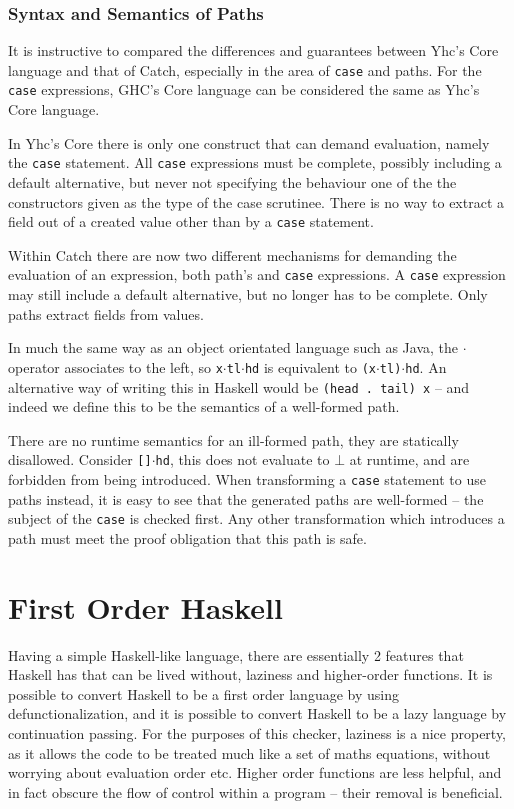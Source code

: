 \documentclass[preprint]{sigplanconf}
\newcommand{\T}[1]{\texttt{#1}}
\newcommand{\D}{\ensuremath{\cdot}} %
\begin{document}
\subsubsection{Syntax and Semantics of Paths}

It is instructive to compared the differences and guarantees between Yhc's Core
language and that of Catch, especially in the area of \T{case} and paths. For
the \T{case} expressions, GHC's Core language can be considered the same as
Yhc's Core language.

In Yhc's Core there is only one construct that can demand evaluation, namely
the \T{case} statement. All \T{case} expressions must be complete, possibly
including a default alternative, but never not specifying the behaviour one of
the the constructors given as the type of the case scrutinee. There is no way
to extract a field out of a created value other than by a \T{case} statement.

Within Catch there are now two different mechanisms for demanding the
evaluation of an expression, both path's and \T{case} expressions. A \T{case}
expression may still include a default alternative, but no longer has to be
complete. Only paths extract fields from values.

In much the same way as an object orientated language such as Java, the \D{}
operator associates to the left, so \T{x\D{}tl\D{}hd} is equivalent to
\T{(x\D{}tl)\D{}hd}. An alternative way of writing this in Haskell would be
\T{(head . tail) x} -- and indeed we define this to be the semantics of a
well-formed path.

There are no runtime semantics for an ill-formed path, they are statically
disallowed. Consider \T{[]\D{}hd}, this does not evaluate to $\bot{}$ at
runtime, and are forbidden from being introduced. When transforming a \T{case}
statement to use paths instead, it is easy to see that the generated paths are
well-formed -- the subject of the \T{case} is checked first. Any other
transformation which introduces a path must meet the proof obligation that this
path is safe.

\section{First Order Haskell}
\label{chap:defunc}

Having a simple Haskell-like language, there are essentially 2 features that
Haskell has that can be lived without, laziness and higher-order functions. It
is possible to convert Haskell to be a first order language by using
defunctionalization, and it is possible to convert Haskell to be a lazy
language by continuation passing. For the purposes of this checker, laziness is
a nice property, as it allows the code to be treated much like a set of maths
equations, without worrying about evaluation order etc. Higher order functions
are less helpful, and in fact obscure the flow of control within a program --
their removal is beneficial.
\end{document}
